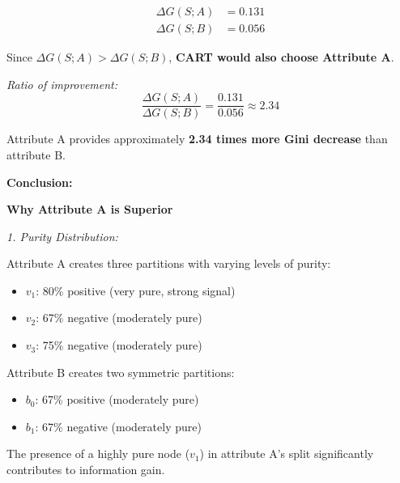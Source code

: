 \documentclass[12pt]{article}
\begin{document}
\begin{solution}
\begin{align*}
\Delta G(S; A) &= 0.131 \\
\Delta G(S; B) &= 0.056
\end{align*}

Since $\Delta G(S; A) > \Delta G(S; B)$, \textbf{CART would also choose Attribute A}.

\textit{Ratio of improvement:}
\[
\frac{\Delta G(S; A)}{\Delta G(S; B)} = \frac{0.131}{0.056} \approx 2.34
\]

Attribute A provides approximately \textbf{2.34 times more Gini decrease} than attribute B.

\textbf{Conclusion:}

\begin{center}
\end{center}

\textbf{Why Attribute A is Superior}

\textit{1. Purity Distribution:}

Attribute A creates three partitions with varying levels of purity:
\begin{itemize}
    \item $v_1$: 80\% positive (very pure, strong signal)
    \item $v_2$: 67\% negative (moderately pure)
    \item $v_3$: 75\% negative (moderately pure)
\end{itemize}

Attribute B creates two symmetric partitions:
\begin{itemize}
    \item $b_0$: 67\% positive (moderately pure)
    \item $b_1$: 67\% negative (moderately pure)
\end{itemize}

The presence of a highly pure node ($v_1$) in attribute A's split significantly contributes to information gain.


\end{solution}
\end{document}
